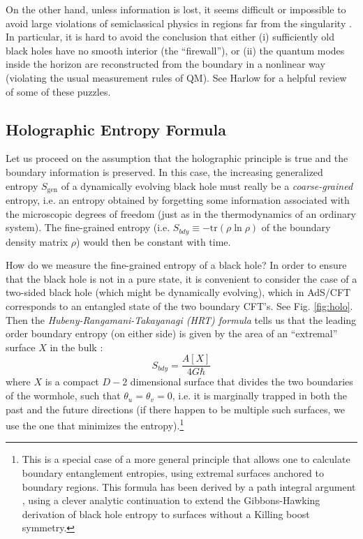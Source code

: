 \documentclass[12pt]{article}
\def\be{\begin{equation}}
\def\ee{\end{equation}}
\begin{document}
On the other hand, unless information is lost, it seems difficult or impossible to avoid large violations of semiclassical physics in regions far from the singularity \cite{Mathur:2009hf,Almheiri:2012rt,Almheiri:2013hfa,Braunstein:2009my}.  In particular, it is hard to avoid the conclusion that either (i) sufficiently old black holes have no smooth interior (the ``firewall''), or (ii) the quantum modes inside the horizon are reconstructed from the boundary in a nonlinear way (violating the usual measurement rules of QM).  See Harlow \cite{harlow} for a helpful review of some of these puzzles.

\subsection{Holographic Entropy Formula}\label{HEF}

Let us proceed on the assumption that the holographic principle is true and the boundary information is preserved.  In this case, the increasing generalized entropy $S_\mathrm{gen}$ of a dynamically evolving black hole must really be a \emph{coarse-grained} entropy, i.e. an entropy obtained by forgetting some information associated with the microscopic degrees of freedom (just as in the thermodynamics of an ordinary system).  The fine-grained entropy (i.e. $S_{bdy} \equiv -\mathrm{tr}\left(\rho \ln \rho \right)$ of the boundary density matrix $\rho$) would then be constant with time.

How do we measure the fine-grained entropy of a black hole?  In order to ensure that the black hole is not in a pure state, it is convenient to consider the case of a two-sided black hole (which might be dynamically evolving), which in AdS/CFT corresponds to an entangled state of the two boundary CFT's.  See Fig. \ref{fig:holo}. Then the \emph{Hubeny-Rangamani-Takayanagi (HRT) formula} tells us that the leading order boundary entropy (on either side) is given by the area of an ``extremal'' surface $X$ in the bulk \cite{Hubeny:2007xt,Headrick:2007km,Ryu:2006bv}:
\be\label{HRT}
S_{bdy} = \frac{A[X]}{4G\hbar}
\ee
where $X$ is a compact $D-2$ dimensional surface that divides the two boundaries of the wormhole, such that $\theta_{u} = \theta_{v} = 0$, i.e. it is marginally trapped in both the past and the future directions (if there happen to be multiple such surfaces, we use the one that minimizes the entropy).\footnote{This is a special case of a more general principle that allows one to calculate boundary entanglement entropies, using extremal surfaces anchored to boundary regions. This formula has been derived by a path integral argument \cite{lewkowycz}, using a clever analytic continuation to extend the Gibbons-Hawking derivation \cite{gibbons1977action} of black hole entropy to surfaces without a Killing boost symmetry.}
\end{document}
